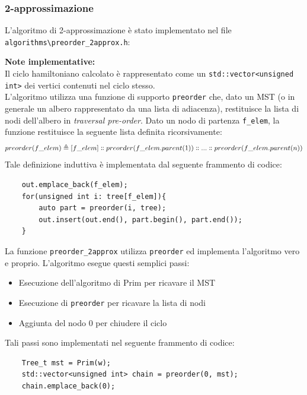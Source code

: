 \documentclass[]{article}
\begin{document}
\subsubsection{2-approssimazione}
\begin{flushleft}
L'algoritmo di 2-approssimazione è stato implementato nel file \verb|algorithms\preorder_2approx.h|:
\lstset{language=c++, style=mystyle}


\textbf{Note implementative:}\\
Il ciclo hamiltoniano calcolato è rappresentato come un \verb|std::vector<unsigned int>| dei vertici contenuti nel ciclo stesso.\\
L'algoritmo utilizza una funzione di supporto \verb|preorder| che, dato un MST (o in generale un albero rappresentato da una lista di adiacenza), restituisce la lista di nodi dell'albero in \textit{traversal pre-order}.
Dato un nodo di partenza \verb|f_elem|, la funzione restituisce la seguente lista definita ricorsivamente:
$$preorder(f\_elem) \triangleq [f\_elem] \dblcolon preorder(f\_elem.parent(1)) \dblcolon ... \dblcolon preorder(f\_elem.parent(n))$$
Tale definizione induttiva è implementata dal seguente frammento di codice:
\lstset{language=c++, style=mystyle, firstnumber=4}
\begin{lstlisting}
	out.emplace_back(f_elem);
	for(unsigned int i: tree[f_elem]){
		auto part = preorder(i, tree);
		out.insert(out.end(), part.begin(), part.end());
	}
\end{lstlisting}
La funzione \verb|preorder_2approx| utilizza \verb|preorder| ed implementa l'algoritmo vero e proprio.
L'algoritmo esegue questi semplici passi:
\begin{itemize}
	\item Esecuzione dell'algoritmo di Prim per ricavare il MST
	\item Esecuzione di \verb|preorder| per ricavare la lista di nodi
	\item Aggiunta del nodo 0 per chiudere il ciclo
\end{itemize}
Tali passi sono implementati nel seguente frammento di codice:
\lstset{language=c++, style=mystyle, firstnumber=13}
\begin{lstlisting}
	Tree_t mst = Prim(w);
	std::vector<unsigned int> chain = preorder(0, mst);
	chain.emplace_back(0);
\end{lstlisting}
\end{flushleft}
\newpage
\end{document}
